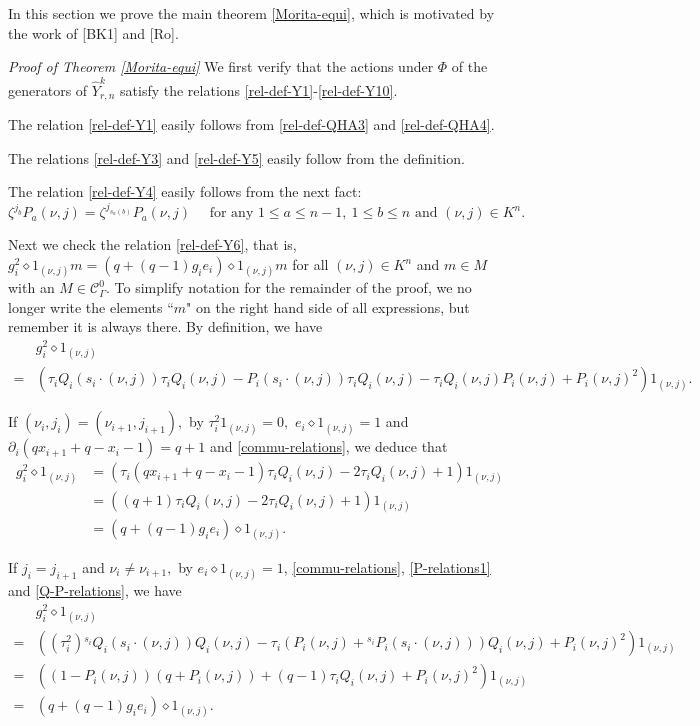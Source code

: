 \documentclass[11pt, reqno]{amsart} \textwidth=14.9cm \oddsidemargin=1cm \evensidemargin=1cm
\theoremstyle{definition}
\numberwithin{equation}{section}
\begin{document}
In this section we prove the main theorem \ref{Morita-equi}, which is motivated by the work of [BK1] and [Ro].\vspace{0.3cm}

{\it Proof of Theorem \ref{Morita-equi}} We first verify that the actions under $\Phi$ of the generators of $\widehat{Y}_{r,n}^{k}$ satisfy the relations \eqref{rel-def-Y1}-\eqref{rel-def-Y10}.

The relation \eqref{rel-def-Y1} easily follows from \eqref{rel-def-QHA3} and \eqref{rel-def-QHA4}.

The relations \eqref{rel-def-Y3} and \eqref{rel-def-Y5} easily follow from the definition.

The relation \eqref{rel-def-Y4} easily follows from the next fact:
\begin{equation*}
\zeta^{j_{b}}P_{a}(\nu, j)=\zeta^{j_{s_{a}(b)}}P_{a}(\nu, j)\quad\text{ for any }1\leq a\leq n-1, ~1\leq b\leq n\text{ and }(\nu, j)\in K^{n}.
\end{equation*}

Next we check the relation \eqref{rel-def-Y6}, that is, $g_{i}^{2}\diamond 1_{(\nu, j)}m=(q+(q-1)g_{i}e_{i})\diamond 1_{(\nu, j)}m$ for all $(\nu, j)\in K^{n}$ and $m\in M$ with an $M\in \mathcal{C}_{\Gamma}^{0}.$ To simplify notation for the remainder of the proof, we no longer write the elements ``$m$" on the right hand side of all expressions, but remember it is always there. By definition, we have
\begin{align*}
&g_{i}^{2}\diamond 1_{(\nu, j)}\\=&(\tau_{i}Q_{i}(s_{i}\cdot(\nu, j))\tau_{i}Q_{i}(\nu, j)-P_{i}(s_{i}\cdot(\nu, j))\tau_{i}Q_{i}(\nu, j)-\tau_{i}Q_{i}(\nu, j)P_{i}(\nu, j)+P_{i}(\nu, j)^{2})1_{(\nu, j)}.
\end{align*}

If $(\nu_{i}, j_{i})=(\nu_{i+1}, j_{i+1}),$ by $\tau_{i}^{2}1_{(\nu, j)}=0,$ $e_{i}\diamond 1_{(\nu, j)}=1$ and $\partial_{i}(qx_{i+1}+q-x_{i}-1)=q+1$ and \eqref{commu-relations}, we deduce that
\begin{align*}
g_{i}^{2}\diamond 1_{(\nu, j)}&=(\tau_{i}(qx_{i+1}+q-x_{i}-1)\tau_{i}Q_{i}(\nu, j)-2\tau_{i}Q_{i}(\nu, j)+1)1_{(\nu, j)}\\
&=((q+1)\tau_{i}Q_{i}(\nu, j)-2\tau_{i}Q_{i}(\nu, j)+1)1_{(\nu, j)}\\
&=(q+(q-1)g_{i}e_{i})\diamond 1_{(\nu, j)}.
\end{align*}

If $j_{i}=j_{i+1}$ and $\nu_{i}\neq \nu_{i+1},$ by $e_{i}\diamond 1_{(\nu, j)}=1$, \eqref{commu-relations}, \eqref{P-relations1} and \eqref{Q-P-relations}, we have
\begin{align*}
&g_{i}^{2}\diamond 1_{(\nu, j)}\\=&((\tau_{i}^{2}){}^{s_{i}}Q_{i}(s_{i}\cdot(\nu, j))Q_{i}(\nu, j)-\tau_{i}(P_{i}(\nu, j)+{}^{s_{i}}P_{i}(s_{i}\cdot(\nu, j)))Q_{i}(\nu, j)+P_{i}(\nu, j)^{2})1_{(\nu, j)}\\
=&((1-P_{i}(\nu, j))(q+P_{i}(\nu, j))+(q-1)\tau_{i}Q_{i}(\nu, j)+P_{i}(\nu, j)^{2})1_{(\nu, j)}\\
=&(q+(q-1)g_{i}e_{i})\diamond 1_{(\nu, j)}.
\end{align*}
\end{document}
